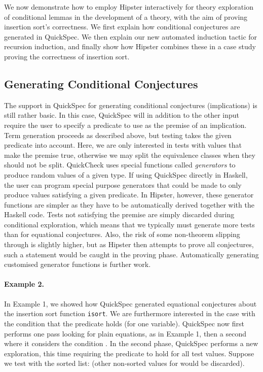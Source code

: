 \label{sec:conditionals}

We now demonstrate how to employ Hipster interactively for theory exploration of conditional lemmas in the development of a theory, with the aim of proving insertion sort's correctness. We first explain how conditional conjectures are generated in QuickSpec. We then explain our new automated induction tactic for recursion induction, and finally show how Hipster combines these in a case study proving the correctness of insertion sort.  

\subsection{Generating Conditional Conjectures}
The support in QuickSpec for generating conditional conjectures (implications) is still rather basic. In this case, QuickSpec will in addition to the other input require the user to specify a predicate to use as the premise of an implication. Term generation proceeds as described above, but testing takes the given predicate into account. Here, we are only interested in tests with values that make the premise true, otherwise we may split the equivalence classes when they should not be split.
QuickCheck uses special functions called \emph{generators} to produce random values of a given type.
If using QuickSpec directly in Haskell, the user can program special purpose generators that could be made to only produce values satisfying a given predicate.
In Hipster, however, these generator functions are simpler as they have to be automatically derived together with the Haskell code.
Tests not satisfying the premise are simply discarded during conditional exploration, which means that we typically must generate more tests than for equational conjectures.
Also, the risk of some non-theorem slipping through is slightly higher, but as Hipster then attempts to prove all conjectures, such a statement would be caught in the proving phase.
Automatically generating customised generator functions is further work. 

\paragraph*{Example 2.}
\label{example2}
In Example 1, we showed how QuickSpec generated equational conjectures about the insertion sort function \texttt{isort}. We are furthermore interested in the case with the condition that the predicate  holds (for one variable). QuickSpec now first performs one pass looking for plain equations, as in Example 1, then a second where it considers the condition . In the second phase, QuickSpec performs a new exploration, this time requiring the predicate  to hold for all test values.
Suppose we test with the sorted list:  (other non-sorted values for  would be discarded).       


